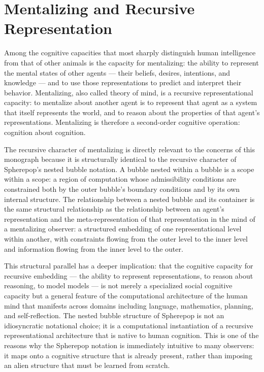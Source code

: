 \documentclass[12pt,openany]{book}
\theoremstyle{plain}
\theoremstyle{definition}
\theoremstyle{remark}
\begin{document}
\section{Mentalizing and Recursive Representation}

Among the cognitive capacities that most sharply distinguish human intelligence from that of other animals is the capacity for mentalizing: the ability to represent the mental states of other agents — their beliefs, desires, intentions, and knowledge — and to use those representations to predict and interpret their behavior. Mentalizing, also called theory of mind, is a recursive representational capacity: to mentalize about another agent is to represent that agent as a system that itself represents the world, and to reason about the properties of that agent's representations. Mentalizing is therefore a second-order cognitive operation: cognition about cognition.

The recursive character of mentalizing is directly relevant to the concerns of this monograph because it is structurally identical to the recursive character of Spherepop's nested bubble notation. A bubble nested within a bubble is a scope within a scope: a region of computation whose admissibility conditions are constrained both by the outer bubble's boundary conditions and by its own internal structure. The relationship between a nested bubble and its container is the same structural relationship as the relationship between an agent's representation and the meta-representation of that representation in the mind of a mentalizing observer: a structured embedding of one representational level within another, with constraints flowing from the outer level to the inner level and information flowing from the inner level to the outer.

This structural parallel has a deeper implication: that the cognitive capacity for recursive embedding — the ability to represent representations, to reason about reasoning, to model models — is not merely a specialized social cognitive capacity but a general feature of the computational architecture of the human mind that manifests across domains including language, mathematics, planning, and self-reflection. The nested bubble structure of Spherepop is not an idiosyncratic notational choice; it is a computational instantiation of a recursive representational architecture that is native to human cognition. This is one of the reasons why the Spherepop notation is immediately intuitive to many observers: it maps onto a cognitive structure that is already present, rather than imposing an alien structure that must be learned from scratch.
\end{document}
